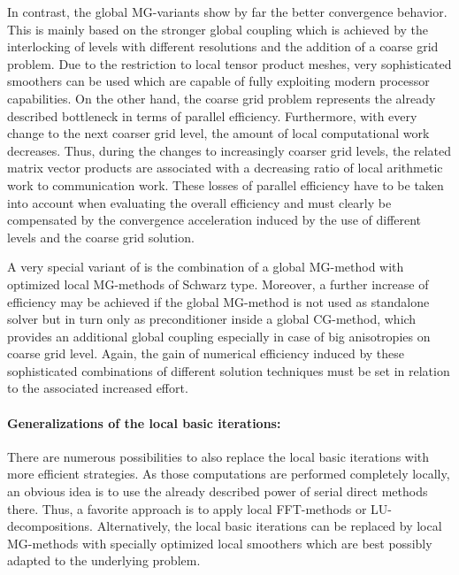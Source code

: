 In contrast, the global MG-variants show by far the better convergence behavior. This is mainly based on the stronger global coupling
which is achieved by the interlocking of levels with different resolutions and the addition of a coarse grid problem. 
Due to the restriction to local tensor product meshes, very sophisticated smoothers can be used which are capable of fully exploiting modern processor capabilities.
On the other hand, the coarse grid problem represents the already described bottleneck in terms of parallel efficiency. Furthermore, with every change to the next coarser grid level, the amount of local computational work decreases. Thus, during the changes to increasingly coarser grid levels, the related matrix vector products are associated with a decreasing ratio of local arithmetic work to communication work. These losses of parallel efficiency have to be taken into account when evaluating the overall efficiency and must clearly be compensated by the convergence acceleration induced by the use of different levels and the coarse grid solution.

A very special variant of \scarc{} is the combination of a global MG-method with optimized local MG-methods of Schwarz type. 
Moreover, a further increase of efficiency may be achieved if the global MG-method is not used as standalone solver but in turn only as preconditioner inside a global CG-method, which provides an additional global coupling especially in case of big anisotropies on coarse grid level.
Again, the gain of numerical efficiency induced by these sophisticated combinations of different solution techniques must be set in relation to the associated increased effort.

\paragraph{Generalizations of the local basic iterations:}
There are numerous possibilities to also replace the local basic iterations with more efficient strategies. 
As those computations are performed completely locally, an obvious idea is to use the already described power of serial direct methods there. 
Thus, a favorite approach is to apply local FFT-methods or LU-decompositions. Alternatively, the local basic iterations can be replaced by local MG-methods with specially optimized local smoothers which are best possibly adapted to the underlying problem.


